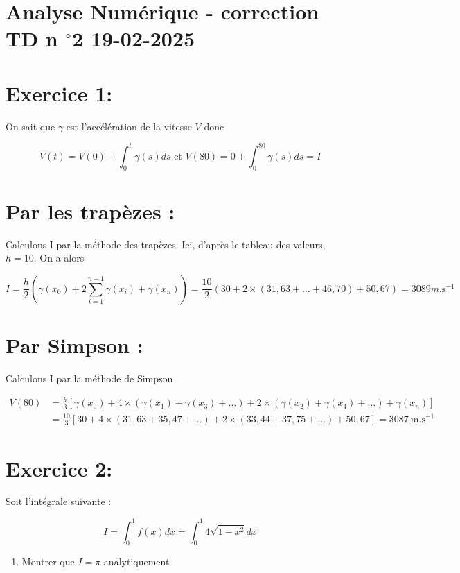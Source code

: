 \documentclass[10pt]{article}
\begin{document}
\section*{Analyse Numérique - correction TD n \({ }^{\circ} \mathbf{2}\) 19-02-2025}
\section*{Exercice 1:}
On sait que \(\gamma\) est l'accélération de la vitesse \(V\) donc

\[
V(t)=V(0)+\int_{0}^{t} \gamma(s) d s \text { et } V(80)=0+\int_{0}^{80} \gamma(s) d s=I
\]

\section*{Par les trapèzes :}
Calculons I par la méthode des trapèzes. Ici, d'après le tableau des valeurs, \(h=10\). On a alors

\[
I=\frac{h}{2}\left(\gamma\left(x_{0}\right)+2 \sum_{i=1}^{n-1} \gamma\left(x_{i}\right)+\gamma\left(x_{n}\right)\right)=\frac{10}{2}(30+2 \times(31,63+\ldots+46,70)+50,67)=3089 m . \mathrm{s}^{-1}
\]

\section*{Par Simpson :}
Calculons I par la méthode de Simpson

\[
\begin{aligned}
V(80) & =\frac{h}{3}\left[\gamma\left(x_{0}\right)+4 \times\left(\gamma\left(x_{1}\right)+\gamma\left(x_{3}\right)+\ldots\right)+2 \times\left(\gamma\left(x_{2}\right)+\gamma\left(x_{4}\right)+\ldots\right)+\gamma\left(x_{n}\right)\right] \\
& =\frac{10}{3}[30+4 \times(31,63+35,47+\ldots)+2 \times(33,44+37,75+\ldots)+50,67]=3087 \mathrm{~m} . \mathrm{s}^{-1}
\end{aligned}
\]

\section*{Exercice 2:}
Soit l'intégrale suivante :

\[
I=\int_{0}^{1} f(x) d x=\int_{0}^{1} 4 \sqrt{1-x^{2}} d x
\]

\begin{enumerate}
  \item Montrer que \(I=\pi\) analytiquement
\end{enumerate}
\end{document}
